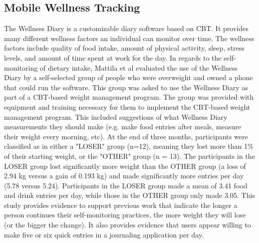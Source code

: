 \subsection{Mobile Wellness Tracking}
The Wellness Diary \citep{mattila_mobile_2008, ahtinen_user_2009, mattila_nuadu_2008, koskinen_customizable_2007, van_gils_feasibility_2001} is a  customizable diary software based on CBT. It provides many different wellness factors an individual can monitor over time. The wellness factors include quality of food intake, amount of physical activity, sleep, stress levels, and amount of time spent at work for the day. In regards to the self-monitoring of dietary intake, Mattila et al evaluated the use of the Wellness Diary by a self-selected group of people who were overweight and owned a phone that could run the software. This group was asked to use the Wellness Diary as part of a CBT-based weight management program. The group was provided with equipment and training necessary for them to implement the CBT-based weight management program. This included suggestions of what Wellness Diary measurements they should make (e.g. make food entries after meals, measure their weight every morning, etc). At the end of three months, participants were classified as in either a "LOSER" group (n=12), meaning they lost more than 1\% of their starting weight, or the "OTHER" group (n = 13). The participants in the LOSER group lost significantly more weight than the OTHER group (a loss of 2.94 kg versus a gain of 0.193 kg) and made significantly more entries per day (5.78 versus 5.24). Participants in the LOSER group made a mean of 3.41 food and drink entries per day, while those in the OTHER group only made 3.05. This study provides evidence to support previous work that indicate the longer a person continues their self-monitoring practices, the more weight they will lose (or the bigger the change). It also provides evidence that users appear willing to make five or six quick entries in a journaling application per day. 

